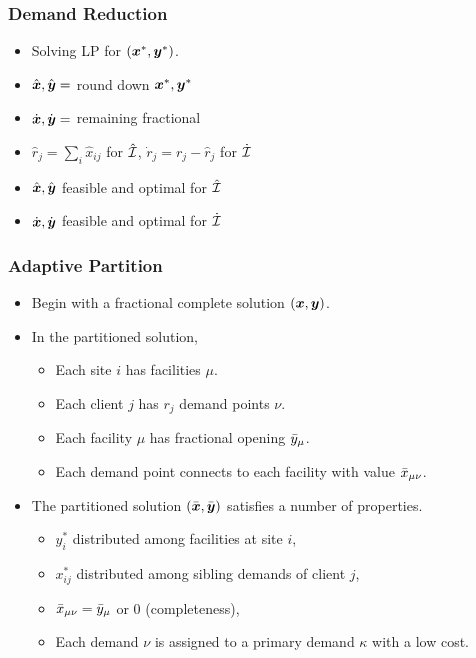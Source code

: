 \documentclass[handout, hyperref, xcolor=dvipsnames]{beamer}
\begin{document}
\begin{frame}
  \frametitle{Demand Reduction}

  \begin{itemize}
  \item Solving LP for $(\boldsymbol{x}^\ast, \boldsymbol{y}^\ast)$.
  \item $\hat{\boldsymbol{x}}, \hat{\boldsymbol{y}} = $ round down $\boldsymbol{x}^\ast, \boldsymbol{y}^\ast$
  \item $\dot{\boldsymbol{x}}, \dot{\boldsymbol{y}} = $ remaining fractional
  \item $\hat r_j = \sum_{i}\hat x_{ij}$ for $\hat{\mathcal{I}}$, $\dot r_j = r_j - \hat r_j$ for $\dot{\mathcal{I}}$
  \item $\hat{\boldsymbol{x}}, \hat{\boldsymbol{y}}$ feasible and optimal for $\hat{\mathcal{I}}$
  \item $\dot{\boldsymbol{x}}, \dot{\boldsymbol{y}}$ feasible and optimal for $\dot{\mathcal{I}}$
  \end{itemize}
\end{frame}




\begin{frame}
  \frametitle{Adaptive Partition}
  \begin{itemize}
  \item Begin with a fractional complete solution $(\boldsymbol{x},\boldsymbol{y})$.
  \item In the partitioned solution,
    \begin{itemize}
    \item Each site $i$ has facilities $\mu$.
    \item Each client $j$ has $r_j$ demand points $\nu$.
    \item Each facility $\mu$ has fractional opening ${\bar y}_{\mu}$.
    \item Each demand point connects to each facility with value
      ${\bar x}_{\mu\nu}$.
    \end{itemize}
    \item The partitioned solution $(\bar{\boldsymbol{x}},\bar{\boldsymbol{y}})$ satisfies a
      number of properties.
      \begin{itemize}
      \item $y_i^\ast$ distributed among facilities at site $i$,
      \item $x_{ij}^\ast$ distributed among sibling demands of client
        $j$,
      \item ${\bar x}_{\mu\nu} = {\bar y}_{\mu}$ or $0$ (completeness),
      \item Each demand $\nu$ is assigned to a primary demand $\kappa$
        with a low cost.
      \end{itemize}
  \end{itemize}
\end{frame}
\end{document}
